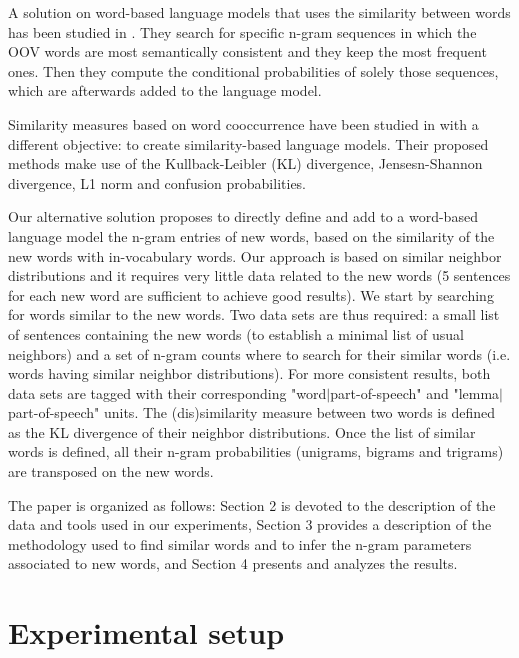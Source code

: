 \documentclass[conference]{IEEEtran}
\begin{document}
A solution on word-based language models that uses the similarity between words has been studied in \cite{Lecorve:2011}. 
They search for specific n-gram sequences in which the OOV words are most semantically consistent and they keep the most frequent ones. Then they compute the conditional probabilities of solely those sequences, which are afterwards added to the language model. 

Similarity measures based on word cooccurrence have been studied in \cite{Dagan:1999} with a different objective: to create similarity-based language models. Their proposed methods make use of the Kullback-Leibler (KL) divergence, Jensesn-Shannon divergence, L1 norm and confusion probabilities. 

Our alternative solution proposes to directly define and add to a word-based language model the n-gram entries of new words, based on the similarity of the new words with in-vocabulary words. Our approach is based on similar neighbor distributions and it requires very little data related to the new words (5 sentences for each new word are sufficient to achieve good results). 
We start by searching for words similar to the new words. Two data sets are thus required: a small list of sentences containing the new words (to establish a minimal list of usual neighbors) and a set of n-gram counts where to search for their similar words (i.e. words having similar neighbor distributions). For more consistent results, both data sets are tagged with their corresponding "word$|$part-of-speech" and "lemma$|$part-of-speech" units. The (dis)similarity measure between two words is defined as the KL divergence of their neighbor distributions. Once the list of similar words is defined, all their n-gram probabilities (unigrams, bigrams and trigrams) are transposed on the new words.

The paper is organized as follows: Section 2 is devoted to the description of the data and tools used in our experiments, Section 3 provides a description of the methodology used to find similar words and to infer the n-gram parameters associated to new words, and Section 4 presents and analyzes the results.

\section{Experimental setup}
\end{document}
